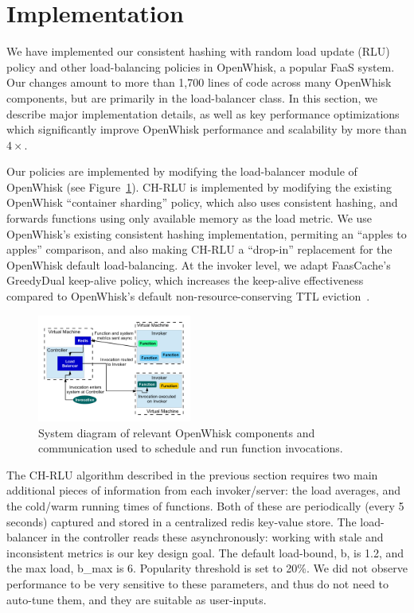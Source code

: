 \vspace*{-0.2cm}
\section{Implementation}
\label{sec:impl}

We have implemented our consistent hashing with random load update (RLU) policy and other load-balancing policies in OpenWhisk, a popular FaaS system.
Our changes amount to more than 1,700 lines of code across many OpenWhisk components, but are primarily in the load-balancer class. 
In this section, we describe major implementation details, as well as key performance optimizations which significantly improve OpenWhisk performance and scalability by more than $4\times$. 

Our policies are implemented by modifying the load-balancer module of OpenWhisk (see Figure~\ref{fig:sys-diag}).
CH-RLU is implemented by modifying the existing OpenWhisk ``container sharding'' policy, which also uses consistent hashing, and forwards functions using only available memory as the load metric.
We use OpenWhisk's existing consistent hashing implementation, permiting an ``apples to apples'' comparison, and also making CH-RLU a ``drop-in'' replacement for the OpenWhisk default load-balancing. 
At the invoker level, we adapt FaasCache's GreedyDual keep-alive policy, which increases the keep-alive effectiveness compared to OpenWhisk's default non-resource-conserving TTL eviction~\cite{faascache-asplos21}. 

\begin{figure}  \includegraphics[width=0.45\textwidth]{../figs/sys-diag.pdf}
    \vspace*{-0.3cm}
  \caption{System diagram of relevant OpenWhisk components and communication used to schedule and run function invocations.}
  \label{fig:sys-diag}
    \vspace*{-0.3cm}
\end{figure}

The CH-RLU algorithm described in the previous section requires two main additional pieces of information from each invoker/server: the load averages, and the cold/warm running times of functions. 
Both of these are periodically (every 5 seconds) captured and stored in a centralized redis key-value store.
The load-balancer in the controller reads these asynchronously: working with stale and inconsistent metrics is our key design goal. 
The default load-bound, b, is 1.2, and the max load, b\_max is 6. Popularity threshold is set to 20\%.
We did not observe performance to be very sensitive to these parameters, and thus do not need to auto-tune them, and they are suitable as user-inputs. 

